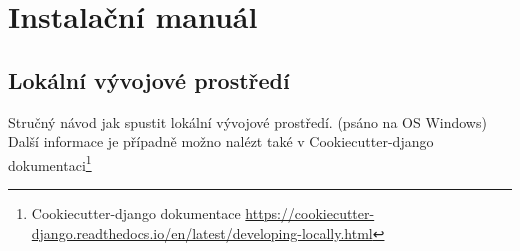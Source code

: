 



\chapter{Instalační manuál}
\label{append:instalace}

\section{Lokální vývojové prostředí}
Stručný návod jak spustit lokální vývojové prostředí. (psáno na OS Windows)\\
Další informace je případně možno nalézt také v Cookiecutter-django dokumentaci\footnote{Cookiecutter-django dokumentace \url{https://cookiecutter-django.readthedocs.io/en/latest/developing-locally.html}}

